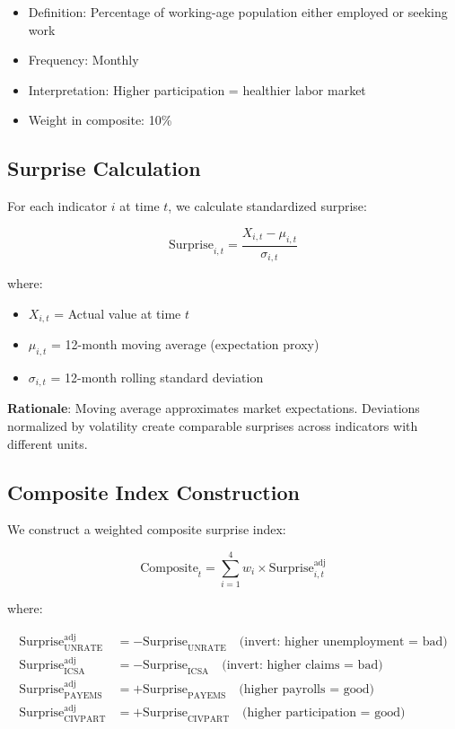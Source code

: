 \documentclass[12pt,a4paper]{article}
\begin{document}
\begin{itemize}
    \item Definition: Percentage of working-age population either employed or seeking work
    \item Frequency: Monthly
    \item Interpretation: Higher participation = healthier labor market
    \item Weight in composite: 10\%
\end{itemize}

\subsection{Surprise Calculation}

For each indicator $i$ at time $t$, we calculate standardized surprise:

\begin{equation}
\text{Surprise}_{i,t} = \frac{X_{i,t} - \mu_{i,t}}{\sigma_{i,t}}
\end{equation}

where:
\begin{itemize}
    \item $X_{i,t}$ = Actual value at time $t$
    \item $\mu_{i,t}$ = 12-month moving average (expectation proxy)
    \item $\sigma_{i,t}$ = 12-month rolling standard deviation
\end{itemize}

\textbf{Rationale}: Moving average approximates market expectations. Deviations normalized by volatility create comparable surprises across indicators with different units.

\subsection{Composite Index Construction}

We construct a weighted composite surprise index:

\begin{equation}
\text{Composite}_t = \sum_{i=1}^{4} w_i \times \text{Surprise}_{i,t}^{\text{adj}}
\end{equation}

where:

\begin{align}
\text{Surprise}_{\text{UNRATE}}^{\text{adj}} &= -\text{Surprise}_{\text{UNRATE}} \quad \text{(invert: higher unemployment = bad)} \\
\text{Surprise}_{\text{ICSA}}^{\text{adj}} &= -\text{Surprise}_{\text{ICSA}} \quad \text{(invert: higher claims = bad)} \\
\text{Surprise}_{\text{PAYEMS}}^{\text{adj}} &= +\text{Surprise}_{\text{PAYEMS}} \quad \text{(higher payrolls = good)} \\
\text{Surprise}_{\text{CIVPART}}^{\text{adj}} &= +\text{Surprise}_{\text{CIVPART}} \quad \text{(higher participation = good)}
\end{align}
\end{document}
